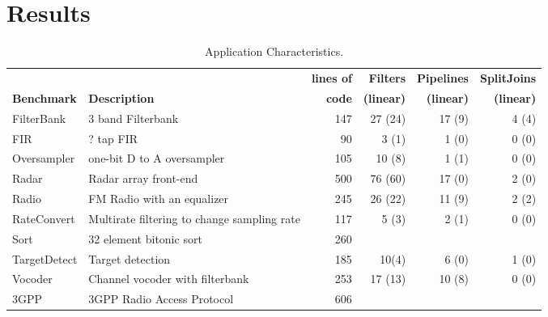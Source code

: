 \section{Results}
\label{sec:results}

\begin{table*}[t]
\begin{center}
\scriptsize
\begin{tabular}{|l|l||r||r|r|r||} \hline
& & {\bf lines of} & {\bf Filters} &  {\bf Pipelines} & {\bf SplitJoins}\\
{\bf Benchmark} & {\bf Description} & {\bf code} & {\bf (linear)} &
 {\bf (linear)} & {\bf (linear)} \\
\hline \hline
FilterBank & 3 band Filterbank & 147 & 27 (24) & 17 (9) & 4 (4)\\ \hline
FIR & ? tap FIR & 90 & 3 (1) & 1 (0) & 0 (0)\\ \hline 
Oversampler & one-bit D to A oversampler & 105 & 10 (8) & 1 (1) & 0 (0)\\ \hline 
Radar & Radar array front-end  & 500 & 76 (60) & 17 (0) & 2 (0)\\ \hline 
Radio & FM Radio with an equalizer & 245 & 26 (22) & 11 (9) & 2 (2)\\ \hline 
RateConvert & Multirate filtering to change sampling rate & 117 & 5 (3) & 2 (1) & 0 (0)\\ \hline 
Sort & 32 element bitonic sort & 260 & & & \\ \hline
TargetDetect & Target detection & 185 & 10(4) & 6 (0) & 1 (0)\\ \hline 
Vocoder & Channel vocoder with filterbank & 253 & 17 (13) & 10 (8) & 0 (0)\\ \hline 
3GPP & 3GPP Radio Access Protocol & 606 & & & \\ \hline
\hline
\end{tabular}
\caption{\protect\small Application Characteristics.}
\label{tab:benchmarks}
\end{center}
\end{table*}

